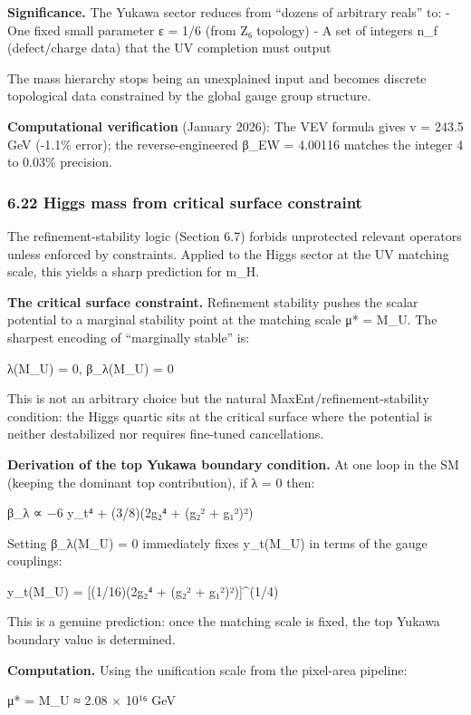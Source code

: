 \documentclass[11pt,a4paper]{article}
\theoremstyle{remark}
\begin{document}
\textbf{Significance.} The Yukawa sector reduces from ``dozens of arbitrary reals'' to:
- One fixed small parameter ε = 1/6 (from Z₆ topology)
- A set of integers n\_f (defect/charge data) that the UV completion must output

The mass hierarchy stops being an unexplained input and becomes discrete
topological data constrained by the global gauge group structure.

\textbf{Computational verification} (January 2026): The VEV formula gives v = 243.5 GeV
(-1.1\% error); the reverse-engineered β\_EW = 4.00116 matches the integer 4
to 0.03\% precision.

\subsubsection{6.22 Higgs mass from critical surface constraint}\label{higgs-mass-from-critical-surface-constraint}

The refinement-stability logic (Section 6.7) forbids unprotected relevant operators unless enforced by constraints. Applied to the Higgs sector at the UV matching scale, this yields a sharp prediction for m\_H.

\textbf{The critical surface constraint.} Refinement stability pushes the scalar potential to a marginal stability point at the matching scale μ* = M\_U. The sharpest encoding of ``marginally stable'' is:

λ(M\_U) = 0, β\_λ(M\_U) = 0

This is not an arbitrary choice but the natural MaxEnt/refinement-stability condition: the Higgs quartic sits at the critical surface where the potential is neither destabilized nor requires fine-tuned cancellations.

\textbf{Derivation of the top Yukawa boundary condition.} At one loop in the SM (keeping the dominant top contribution), if λ = 0 then:

β\_λ ∝ −6 y\_t⁴ + (3/8)(2g₂⁴ + (g₂² + g₁²)²)

Setting β\_λ(M\_U) = 0 immediately fixes y\_t(M\_U) in terms of the gauge couplings:

y\_t(M\_U) = {[}(1/16)(2g₂⁴ + (g₂² + g₁²)²){]}\^{}(1/4)

This is a genuine prediction: once the matching scale is fixed, the top Yukawa boundary value is determined.

\textbf{Computation.} Using the unification scale from the pixel-area pipeline:

μ* = M\_U ≈ 2.08 × 10¹⁶ GeV
\end{document}
